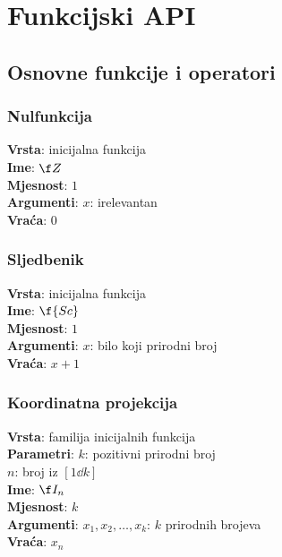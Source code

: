 \setlength{\parindent}{0pt}

\chapter{Funkcijski API}

\section{Osnovne funkcije i operatori}

\subsection{Nulfunkcija}
\textbf{Vrsta}: inicijalna funkcija\\
\textbf{Ime}: $\f Z$\\
\textbf{Mjesnost}: $1$\\
\textbf{Argumenti}: $x$: irelevantan\\
\textbf{Vraća}: $0$

\subsection{Sljedbenik}
\textbf{Vrsta}: inicijalna funkcija\\
\textbf{Ime}: $\f{Sc}$\\
\textbf{Mjesnost}: $1$\\
\textbf{Argumenti}: $x$: bilo koji prirodni broj\\
\textbf{Vraća}: $x+1$

\subsection{Koordinatna projekcija}
\textbf{Vrsta}: familija inicijalnih funkcija\\
\textbf{Parametri}: $k$: pozitivni prirodni broj\\
$n$: broj iz $[1\dd k]$\\
\textbf{Ime}: $\f I_n$\\
\textbf{Mjesnost}: $k$\\
\textbf{Argumenti}: $x_1,x_2,\dots,x_k$: $k$ prirodnih brojeva\\
\textbf{Vraća}: $x_n$

